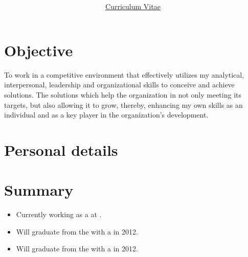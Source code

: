 \documentclass[10pt]{article}
\title{\Huge{\textbf{\myName}}}
\author{\Large{\underline{Curriculum Vitae}}}
\date{}
\begin{document}
\maketitle

\section*{Objective}
To work in a competitive environment that effectively utilizes my analytical, 
interpersonal, leadership and organizational skills to conceive and achieve 
solutions. The solutions which help the organization in not only meeting its 
targets, but also allowing it to grow, thereby, enhancing my own skills as an 
individual and as a key player in the organization's development.

\section*{Personal details}
\begin{personalDetails}
\end{personalDetails}

\section*{Summary}
\begin{itemize}
\begin{comment}
	\item Currently working as a \jobTitle{Graduate Software Engineer} at the 
		\company{Reserve Bank of Australia}.
\end{comment}
	\item Currently working as a  at  
		.
	\item Will graduate from the  with 
		a  in 2012.
	\item Will graduate from the  with 
		a  in 2012.
\end{itemize}
\end{document}
